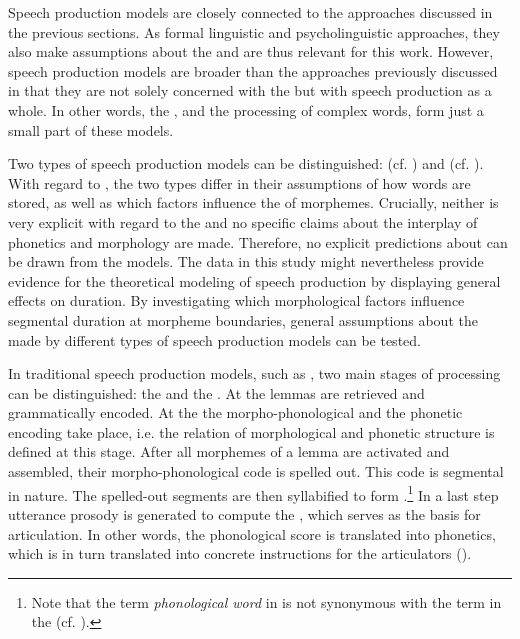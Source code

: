 Speech production models are closely connected to the approaches discussed in the previous sections. As formal linguistic and psycholinguistic approaches, they also make assumptions about the  and are thus relevant for this work. However, speech production models are broader than the approaches previously discussed in that they are not solely concerned with the  but with speech production as a whole. In other words, the , and the processing of complex words, form just a small part of these models.

 Two types of  speech production models can be distinguished:  (cf. \citealt{Levelt.1999,Levelt.1999b,Levelt.2000}) and  (cf. \citealt{Johnson.1997b,Bybee.2002,Pierrehumbert.2001,Pierrehumbert.2002}). With regard to , the two types differ in their assumptions of how words are stored, as well as which factors influence the  of morphemes. Crucially, neither is very explicit with regard to the  and no specific claims about the interplay of phonetics and morphology are made. Therefore, no explicit predictions about  can be drawn from the models. The data in this study might nevertheless provide evidence for the theoretical modeling of  speech production by displaying general effects on duration. By investigating which morphological factors influence segmental duration at morpheme boundaries, general assumptions about the  made by different types of speech production models can be tested.

In traditional speech production models, such as  \cite{Levelt.1999b}, two main stages of processing can be distinguished: the  and the . At the  lemmas are retrieved and grammatically encoded. At the  the morpho-phonological and the phonetic encoding take place, i.e. the relation of morphological and phonetic structure is defined at this stage. After all morphemes of a lemma are activated and assembled, their morpho-phonological code is spelled out. This code is segmental in nature. The spelled-out segments are then syllabified to form .\footnote{Note that the term \textit{phonological word} in \cite{Levelt.1999b} is not synonymous with the term in the  (cf. ). } In a last step utterance prosody is generated to compute the , which serves as the basis for articulation. In other words, the phonological score is translated into phonetics, which is in turn translated into concrete instructions for the articulators ().

